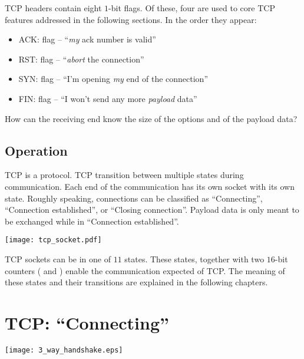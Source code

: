 TCP headers contain eight $1$-bit flags. Of these, four are used to core TCP features addressed in the following
sections. In the order they appear:
\begin{itemize}
\item ACK:  flag -- ``\textit{my} ack number is valid''
\item RST:  flag -- ``\textit{abort} the connection''
\item SYN:  flag -- ``I'm opening \textit{my} end of the connection''
\item FIN:  flag -- ``I won't send any more \textit{payload} data''
\end{itemize}

\begin{exercise}
How can the receiving end know the size of the options and of the payload data?
\end{exercise}

\subsection{Operation}

TCP is a  protocol. TCP  transition between 
multiple states during communication. Each end of the communication has its own 
socket with its own state.
% 
Roughly speaking, connections can be classified as ``Connecting'', 
``Connection established'', or ``Closing connection''.
% 
Payload data is only meant to be exchanged while in ``Connection established''.

\begin{center}
 \texttt{[image: tcp\_socket.pdf]}
\end{center}

TCP sockets can be in one of $11$ states. These states, together with two $16$-bit counters 
( and ) enable the communication  
expected of TCP. The meaning of these states and their transitions are explained in the 
following chapters.

\section{TCP: ``Connecting''}\label{sec:layer4:tcp_opening}

\begin{center}
\texttt{[image: 3\_way\_handshake.eps]}
\end{center}

